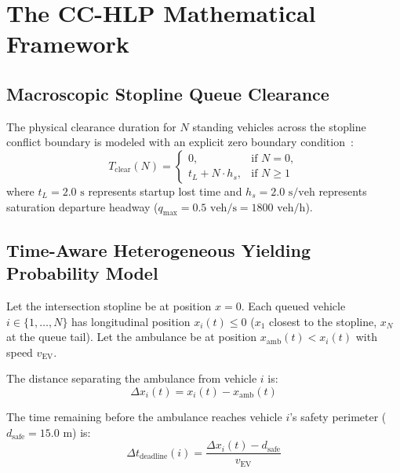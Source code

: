 \documentclass[journal,10pt,twocolumn]{IEEEtran}
\begin{document}
\section{The CC-HLP Mathematical Framework}

\subsection{Macroscopic Stopline Queue Clearance}
The physical clearance duration for $N$ standing vehicles across the stopline conflict boundary is modeled with an explicit zero boundary condition~\cite{webster1958}:
\begin{equation}
T_{\text{clear}}(N) = \begin{cases} 
0, & \text{if } N = 0, \\[3pt] 
t_L + N \cdot h_s, & \text{if } N \ge 1 
\end{cases}
\end{equation}
where $t_L = 2.0\text{ s}$ represents startup lost time and $h_s = 2.0\text{ s/veh}$ represents saturation departure headway ($q_{\max} = 0.5\text{ veh/s} = 1800\text{ veh/h}$).

\subsection{Time-Aware Heterogeneous Yielding Probability Model}
Let the intersection stopline be at position $x = 0$. Each queued vehicle $i \in \{1, \dots, N\}$ has longitudinal position $x_i(t) \le 0$ ($x_1$ closest to the stopline, $x_N$ at the queue tail). Let the ambulance be at position $x_{\text{amb}}(t) < x_i(t)$ with speed $v_{\text{EV}}$.

The distance separating the ambulance from vehicle $i$ is:
\begin{equation}
\Delta x_i(t) = x_i(t) - x_{\text{amb}}(t)
\end{equation}

The time remaining before the ambulance reaches vehicle $i$'s safety perimeter ($d_{\text{safe}} = 15.0\text{ m}$) is:
\begin{equation}
\Delta t_{\text{deadline}}(i) = \frac{\Delta x_i(t) - d_{\text{safe}}}{v_{\text{EV}}}
\end{equation}
\end{document}
